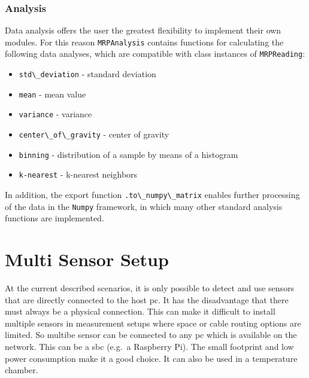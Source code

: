 \hypertarget{analysis}{%
\subsubsection{Analysis}\label{analysis}}

Data analysis offers the user the greatest flexibility to implement
their own modules. For this reason \passthrough{\lstinline!MRPAnalysis!}
contains functions for calculating the following data analyses, which
are compatible with class instances of
\passthrough{\lstinline!MRPReading!}:

\begin{itemize}
\tightlist
\item
  \passthrough{\lstinline!std\_deviation!} - standard deviation
\item
  \passthrough{\lstinline!mean!} - mean value
\item
  \passthrough{\lstinline!variance!} - variance
\item
  \passthrough{\lstinline!center\_of\_gravity!} - center of gravity
\item
  \passthrough{\lstinline!binning!} - distribution of a sample by means
  of a histogram
\item
  \passthrough{\lstinline!k-nearest!} - k-nearest neighbors
\end{itemize}

In addition, the export function
\passthrough{\lstinline!.to\_numpy\_matrix!} enables further processing
of the data in the
\passthrough{\lstinline!Numpy!}\cite{harris2020array} framework, in
which many other standard analysis functions are implemented.

\hypertarget{multi-sensor-setup}{%
\section{Multi Sensor Setup}\label{multi-sensor-setup}}

At the current described scenarios, it is only possible to detect and
use sensors that are directly connected to the host \gls{pc}. It has the
disadvantage that there must always be a physical connection. This can
make it difficult to install multiple sensors in measurement setups
where space or cable routing options are limited. So multibe sensor can
be connected to any \gls{pc} which is available on the network. This can
be a \gls{sbc} (e.g.~a Raspberry Pi). The small footprint and low power
consumption make it a good choice. It can also be used in a temperature
chamber.

